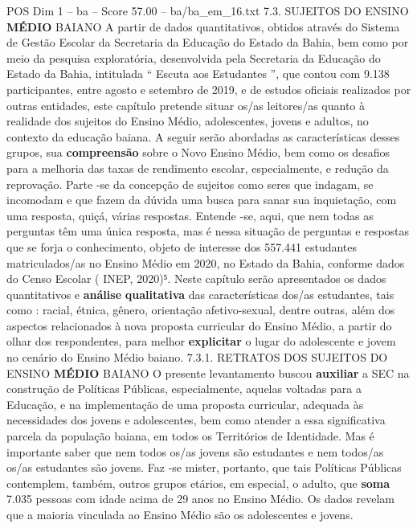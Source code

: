 \begin{textsample}{POS Dim 1 – ba – Score 57.00 – ba/ba\_em\_16.txt}  \label{ex:f1_pos_105}
7.3.
SUJEITOS DO ENSINO \textbf{MÉDIO} BAIANO A partir de dados quantitativos, obtidos através do Sistema de Gestão Escolar da Secretaria da Educação do Estado da Bahia, bem como por meio da pesquisa exploratória, desenvolvida pela Secretaria da Educação do Estado da Bahia, intitulada “ Escuta aos Estudantes ”, que contou com 9.138 participantes, entre agosto e setembro de 2019, e de estudos oficiais realizados por outras entidades, este capítulo pretende situar os/as leitores/as quanto à realidade dos sujeitos do Ensino Médio, adolescentes, jovens e adultos, no contexto da educação baiana.
A seguir serão abordadas as características desses grupos, sua \textbf{compreensão} sobre o Novo Ensino Médio, bem como os desafios para a melhoria das taxas de rendimento escolar, especialmente, e redução da reprovação.
Parte -se da concepção de sujeitos como seres que indagam, se incomodam e que fazem da dúvida uma busca para sanar sua inquietação, com uma resposta, quiçá, várias respostas.
Entende -se, aqui, que nem todas as perguntas têm uma única resposta, mas é nessa situação de perguntas e respostas que se forja o conhecimento, objeto de interesse dos 557.441 estudantes matriculados/as no Ensino Médio em 2020, no Estado da Bahia, conforme dados do Censo Escolar ( INEP, 2020)⁵.
Neste capítulo serão apresentados os dados quantitativos e \textbf{análise} \textbf{qualitativa} das características dos/as estudantes, tais como : racial, étnica, gênero, orientação afetivo-sexual, dentre outras, além dos aspectos relacionados à nova proposta curricular do Ensino Médio, a partir do olhar dos respondentes, para melhor \textbf{explicitar} o lugar do adolescente e jovem no cenário do Ensino Médio baiano. 7.3.1.
RETRATOS DOS SUJEITOS DO ENSINO \textbf{MÉDIO} BAIANO O presente levantamento buscou \textbf{auxiliar} a SEC na construção de Políticas Públicas, especialmente, aquelas voltadas para a Educação, e na implementação de uma proposta curricular, adequada às necessidades dos jovens e adolescentes, bem como atender a essa significativa parcela da população baiana, em todos os Territórios de Identidade.
Mas é importante saber que nem todos os/as jovens são estudantes e nem todos/as os/as estudantes são jovens.
Faz -se mister, portanto, que tais Políticas Públicas contemplem, também, outros grupos etários, em especial, o adulto, que \textbf{soma} 7.035 pessoas com idade acima de 29 anos no Ensino Médio.
Os dados revelam que a maioria vinculada ao Ensino Médio são os adolescentes e jovens.

\end{textsample}
